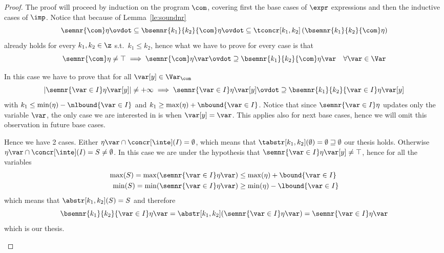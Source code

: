 \begin{proof}
  The proof will proceed by induction on the program \(\com\),
  covering first the base cases of \(\expr\) expressions and then the
  inductive cases of \(\imp\). Notice that because of
  Lemma~\ref{le:soundnr}
  \begin{equation*}
    \semnr{\com} \eta \ovdot\subseteq \bsemnr{k_1}{k_2}{\com}\eta \ovdot\subseteq \tconcr[k_1,k_2]\left(\bsemnr{k_1}{k_2}{\com}\eta\right)
  \end{equation*}
  already holds for every \(k_1, k_2 \in \z\) s.t.\ \(k_1\leq k_2\),
  hence what we have to prove for every case is that
  \[\semnr{\com}\eta \neq \top \implies \semnr{\com} \eta
    \var \ovdot\supseteq \bsemnr{k_1}{k_2}{\com}\eta\var \quad \forall
    \var\in\Var\]
  \begin{inductive}
     In this case we have to prove that for all
    \(\var[y] \in \Var_{\com}\)
    \[|\semnr{\var\in I}\eta\var[y]| \neq + \infty \implies
      \semnr{\var\in I}\eta \var[y] \ovdot\supseteq
      \bsemnr{k_1}{k_2}{\var\in I}\eta\var[y]\] with
    \(k_1\leq \min(\eta) - \nlbound{\var \in I}\) and
    \(k_1\geq \max(\eta) + \nbound{\var \in I}\). Notice that since
    \(\semnr{\var \in I}\eta\) updates only the variable \(\var\), the
    only case we are interested in is when \(\var[y] = \var\). This
    applies also for next base cases, hence we will omit this
    observation in future base cases.

    \medskip

    \noindent
    Hence we have 2 cases. Either
    \(\eta\var \cap \concr[\inte](I) = \emptyset\), which means that
    \(\tabstr[k_1,k_2]({\emptyset}) = \emptyset \sqsupseteq \emptyset\)
    our thesis holds. Otherwise
    \(\eta\var \cap \concr[\inte](I) = S \neq \emptyset\). In this
    case we are under the hypothesis that
    \(\semnr{\var\in I}\eta\var[y] \neq \top\), hence for all the variables 
    \begin{align*}
      \max(S) = \max(\semnr{\var\in I}\eta\var) & \leq \max(\eta) + \bound{\var \in I}\\
      \min(S) = \min(\semnr{\var\in I}\eta\var) & \geq \min(\eta) - \lbound{\var \in I}
    \end{align*}
    which means that \(\abstr[k_1,k_2](S) = S\) and therefore
    \begin{equation*}
      \bsemnr{k_1}{k_2}{\var\in I}\eta\var = \abstr[k_1,k_2](\semnr{\var\in I}\eta\var) = \semnr{\var\in I}\eta\var
    \end{equation*}
    which is our thesis.


\end{inductive}
\end{proof}

